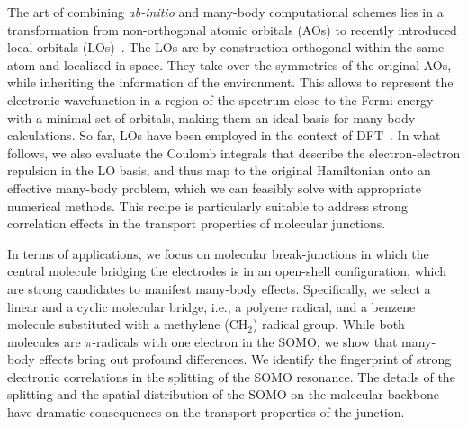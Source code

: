 \documentclass[aps,prx,twocolumn,superscriptaddress]{revtex4-2}
\begin{document}
The art of combining \emph{ab-initio} and many-body computational schemes
lies in a transformation 
from non-orthogonal atomic orbitals (AOs) 
to recently introduced local orbitals (LOs)~\cite{gandusJCP153}. 
The LOs are by construction orthogonal within the same atom and localized in space.
They take over the symmetries of the original AOs, while inheriting the information
of the environment. 
This allows to represent the electronic wavefunction 
in a region of the spectrum close to the Fermi energy with a minimal set of orbitals,
making them an ideal basis for many-body calculations.
So far, LOs have been employed in the context of DFT~\cite{gandusJCP153}.  
In what follows, we also evaluate the Coulomb integrals that describe the electron-electron repulsion in the LO basis,  
and thus map to the original Hamiltonian 
onto an effective many-body problem, which we can feasibly solve with appropriate numerical methods. 
This recipe is particularly suitable to address strong correlation effects in the transport properties 
of molecular junctions. 

In terms of applications, we focus on molecular break-junctions in which the central 
molecule bridging the electrodes is in an open-shell configuration, 
which are strong candidates to manifest many-body effects. 
Specifically, we select a linear and a cyclic molecular bridge, 
i.e., a polyene radical, and a benzene molecule substituted with a methylene (CH$_2$) radical group. 
While both molecules are $\pi$-radicals with one electron in the SOMO, 
we show that many-body effects bring out profound differences. 
We identify the fingerprint of strong electronic correlations in the splitting 
of the SOMO resonance.
The details of the splitting and the spatial distribution of the SOMO on the molecular
backbone have dramatic consequences on the transport properties of the junction.  
\end{document}
